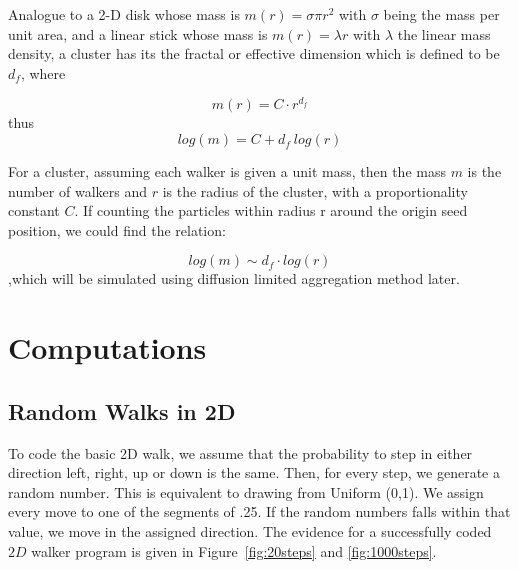 \documentclass[12pt]{article}
\begin{document}
Analogue to a 2-D disk whose mass is $m(r)=\sigma \pi r^2$ with $\sigma$ being the mass per unit area, and a linear stick whose mass is $m(r)=\lambda r$ with $\lambda$ the linear mass density, a cluster has its the fractal or effective dimension which is defined to be $d_f$, where

\begin{equation}
  \label{eq:fractaldimension1}
     m(r)=C\cdot r^{d_f}
\end{equation}
thus
\begin{equation}
  \label{eq:fractaldimension2}
     log(m)=C+d_f\ log(r)
\end{equation}

For a cluster, assuming each walker is given a unit mass, then the mass $m$ is the number of walkers and $r$ is the radius of the cluster, with a proportionality constant $C$. If counting the particles within radius r around the origin seed position, we could find the relation:

\begin{equation}
  \label{eq:fractaldimension3}
     log(m) \sim d_f \cdot log(r)
\end{equation}
,which will be simulated using diffusion limited aggregation method later.
 




\section{Computations}
\label{sec:computations}

\subsection{Random Walks in 2D}
\label{sec:computationsRandomWalk}
To code the basic 2D walk, we assume that the probability to step in either direction left, right, up or down is the same. Then, for every step, we generate a random number. This is equivalent to drawing from Uniform (0,1). We assign every move to one of the segments of .25. If the random numbers falls within that value, we move in the assigned direction. The evidence for a successfully coded $2D$ walker program is given in Figure~\ref{fig:20steps} and \ref{fig:1000steps}.
\end{document}
